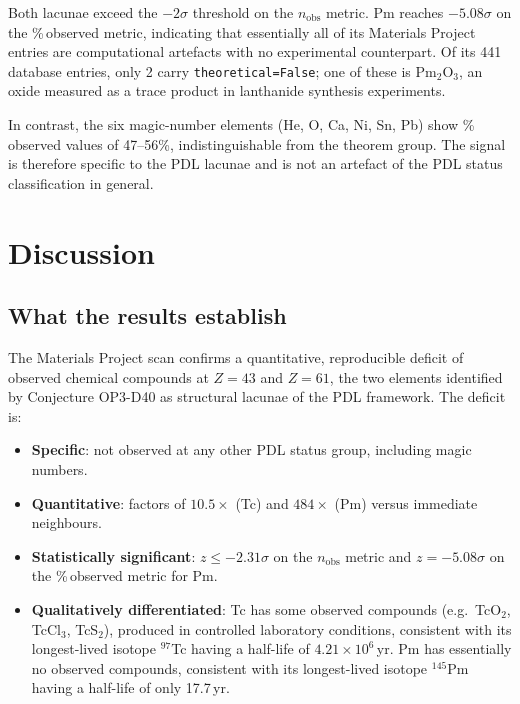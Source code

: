 \documentclass[11pt,a4paper]{article}
\theoremstyle{definition}
\theoremstyle{remark}
\begin{document}
\noindent Both lacunae exceed the $-2\sigma$ threshold on the $n_{\mathrm{obs}}$ metric. Pm reaches $-5.08\sigma$ on the \%\,observed metric, indicating that essentially all of its Materials Project entries are computational artefacts with no experimental counterpart. Of its 441 database entries, only 2 carry \texttt{theoretical=False}; one of these is Pm$_2$O$_3$, an oxide measured as a trace product in lanthanide synthesis experiments.

In contrast, the six magic-number elements (He, O, Ca, Ni, Sn, Pb) show \%\,observed values of 47--56\%, indistinguishable from the theorem group. The signal is therefore specific to the PDL lacunae and is not an artefact of the PDL status classification in general.

\section{Discussion}
\label{sec:discussion}

\subsection{What the results establish}

The Materials Project scan confirms a quantitative, reproducible deficit of observed chemical compounds at $Z=43$ and $Z=61$, the two elements identified by Conjecture OP3-D40 as structural lacunae of the PDL framework. The deficit is:
\begin{itemize}
  \item \textbf{Specific}: not observed at any other PDL status group, including magic numbers.
  \item \textbf{Quantitative}: factors of $10.5\times$ (Tc) and $484\times$ (Pm) versus immediate neighbours.
  \item \textbf{Statistically significant}: $z \leq -2.31\sigma$ on the $n_{\mathrm{obs}}$ metric and $z = -5.08\sigma$ on the \%\,observed metric for Pm.
  \item \textbf{Qualitatively differentiated}: Tc has some observed compounds (e.g.\ TcO$_2$, TcCl$_3$, TcS$_2$), produced in controlled laboratory conditions, consistent with its longest-lived isotope $^{97}$Tc having a half-life of $4.21\times10^6$\,yr. Pm has essentially no observed compounds, consistent with its longest-lived isotope $^{145}$Pm having a half-life of only 17.7\,yr.
\end{itemize}
\end{document}
